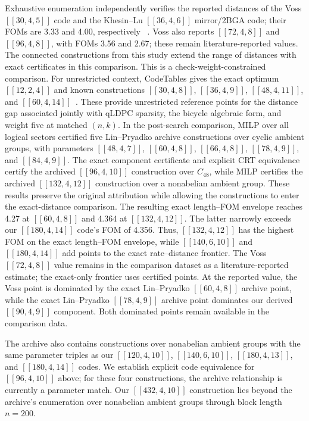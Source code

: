 \documentclass[aps,prx,twocolumn,superscriptaddress,nofootinbib,floatfix]{revtex4-2}
\newcommand{\code}[1]{\ensuremath{\left[\!\left[#1\right]\!\right]}}
\begin{document}
Exhaustive enumeration independently verifies the reported distances of the
Voss $\code{30,4,5}$ code and the Khesin--Lu $\code{36,4,6}$ mirror/2BGA
code; their FOMs are 3.33 and 4.00, respectively
~\cite{voss2025multivariate,khesin2026mirror}.  Voss also reports
$\code{72,4,8}$ and $\code{96,4,8}$, with FOMs 3.56 and 2.67; these remain
literature-reported values.  The connected constructions from this study
extend the range of distances with exact certificates in this comparison.
This is a check-weight-constrained comparison.  For unrestricted context,
CodeTables gives the exact optimum $\code{12,2,4}$ and known constructions
$\code{30,4,8}$, $\code{36,4,9}$, $\code{48,4,11}$, and
$\code{60,4,14}$~\cite{grassl2026codetables}.  These provide unrestricted
reference points for the distance gap associated jointly with qLDPC sparsity,
the bicycle algebraic form, and weight five at matched $(n,k)$.
In the post-search comparison, MILP over all logical sectors certified five
Lin--Pryadko archive constructions over cyclic ambient groups, with parameters
$\code{48,4,7}$, $\code{60,4,8}$, $\code{66,4,8}$,
$\code{78,4,9}$, and $\code{84,4,9}$.  The exact component certificate and
explicit CRT equivalence certify the archived $\code{96,4,10}$ construction
over $C_{48}$, while MILP certifies the archived $\code{132,4,12}$ construction
over a nonabelian ambient group.  These results preserve the original
attribution while allowing the constructions to enter the exact-distance
comparison.  The resulting exact length--FOM envelope reaches 4.27 at
$\code{60,4,8}$ and
4.364 at $\code{132,4,12}$.  The latter narrowly exceeds our
$\code{180,4,14}$ code's FOM of 4.356.  Thus,
$\code{132,4,12}$ has the highest FOM on the exact length--FOM envelope, while
$\code{140,6,10}$ and $\code{180,4,14}$ add points to the exact
rate--distance frontier.
The Voss $\code{72,4,8}$ value remains in the comparison dataset as a
literature-reported estimate; the exact-only frontier uses certified points.
At the reported value, the Voss point is dominated by the exact Lin--Pryadko
$\code{60,4,8}$ archive point, while the exact Lin--Pryadko $\code{78,4,9}$
archive point dominates our derived $\code{90,4,9}$ component.  Both dominated
points remain available in the comparison data.

The archive also contains constructions over nonabelian ambient groups with the
same parameter triples as our $\code{120,4,10}$, $\code{140,6,10}$,
$\code{180,4,13}$, and $\code{180,4,14}$ codes.  We establish explicit code
equivalence for $\code{96,4,10}$ above; for these four constructions, the
archive relationship is currently a parameter match.  Our $\code{432,4,10}$
construction lies beyond the archive's enumeration over nonabelian ambient
groups through block length $n=200$.
\end{document}
